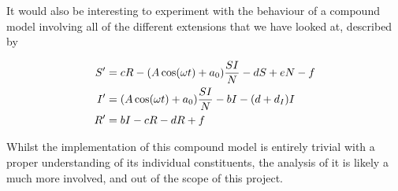 \documentclass[10pt,showpacs,preprintnumbers,amsmath,amssymb,nofootinbib,aps,prl,twocolumn,groupedaddress,superscriptaddress,showkeys]{revtex4-1}
\begin{document}
  It would also be interesting to experiment with the behaviour of a compound model involving all of the different extensions that we have looked at, described by

  \begin{align}
     \begin{split}
        S' &= cR - \qty(A\cos(\omega t) + a_0)\frac{SI}{N} - dS + eN - f \\
        I' &= \qty(A\cos(\omega t)+a_0)\frac{SI}{N} - bI  - (d + d_I)I \\
        R' &= bI - cR - dR + f
     \end{split}
  \end{align} 

   Whilst the implementation of this compound model is entirely trivial with a proper understanding of its individual constituents, the analysis of it is likely a much more involved, and out of the scope of this project.




\end{document}
